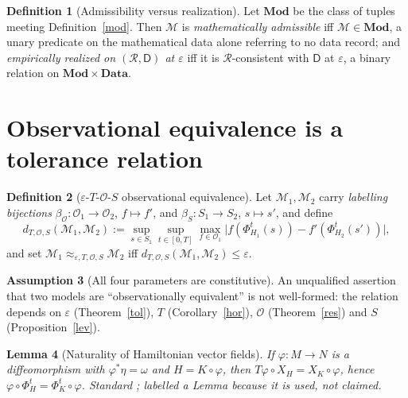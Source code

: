 \documentclass[12pt,a4paper]{article}
\theoremstyle{definition}
\newtheorem{definition}{Definition}[section]
\newtheorem{assumption}[definition]{Assumption}
\theoremstyle{plain}
\newtheorem{lemma}[definition]{Lemma}
\theoremstyle{commentary}
\newcommand{\Oc}{\mathcal{O}}
\newcommand{\Mc}{\mathcal{M}}
\newcommand{\Dsf}{\mathsf{D}}
\newcommand{\eps}{\varepsilon}
\newcommand{\Mod}{\mathbf{Mod}}
\newcommand{\Data}{\mathbf{Data}}
\newcommand{\Rc}{\mathcal{R}}
\begin{document}
\begin{definition}[Admissibility versus realization]
\label{adm}
Let $\Mod$ be the class of tuples meeting Definition~\ref{mod}. Then $\Mc$ is \emph{mathematically admissible} iff $\Mc\in\Mod$, a unary predicate on the mathematical data alone referring to no data record; and \emph{empirically realized on $(\Rc,\Dsf)$ at $\eps$} iff it is $\Rc$-consistent with $\Dsf$ at $\eps$, a binary relation on $\Mod\times\Data$.
\end{definition}

\section{Observational equivalence is a tolerance relation}
\label{s3}

\begin{definition}[$\eps$-$T$-$\Oc$-$S$ observational equivalence]
\label{eqv}
Let $\Mc_1,\Mc_2$ carry \emph{labelling bijections} $\beta_\Oc:\Oc_1\to\Oc_2$, $f\mapsto f'$, and $\beta_S:S_1\to S_2$, $s\mapsto s'$, and define
\[
d_{T,\Oc,S}(\Mc_1,\Mc_2):=\sup_{s\in S_1}\sup_{t\in[0,T]}\max_{f\in\Oc_1}\big|f(\Phi^t_{H_1}(s))-f'(\Phi^t_{H_2}(s'))\big|,
\]
and set $\Mc_1\approx_{\eps,T,\Oc,S}\Mc_2$ iff $d_{T,\Oc,S}(\Mc_1,\Mc_2)\le\eps$.
\end{definition}

\begin{assumption}[All four parameters are constitutive]
\label{par}
An unqualified assertion that two models are ``observationally equivalent'' is not well-formed: the relation depends on $\eps$ (Theorem~\ref{tol}), $T$ (Corollary~\ref{hor}), $\Oc$ (Theorem~\ref{res}) and $S$ (Proposition~\ref{lev}).
\end{assumption}

\begin{lemma}[Naturality of Hamiltonian vector fields]
\label{nat}
If $\varphi:M\to N$ is a diffeomorphism with $\varphi^*\eta=\omega$ and $H=K\circ\varphi$, then $T\varphi\circ X_H=X_K\circ\varphi$, hence $\varphi\circ\Phi^t_H=\Phi^t_K\circ\varphi$. Standard \cite[Ch.~3]{AbrahamMarsden1978}; labelled a Lemma because it is used, not claimed.
\end{lemma}
\end{document}
